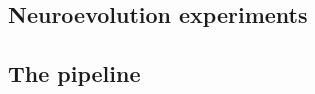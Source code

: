 \subsection{Neuroevolution experiments}



\subsection{The pipeline}
\label{sec:pipeline-results}




























































